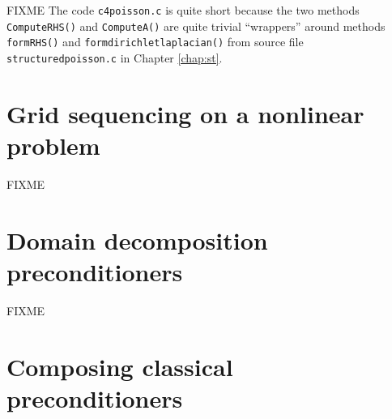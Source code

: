 
FIXME The code \texttt{c4poisson.c} is quite short because the two methods \texttt{ComputeRHS()} and \texttt{ComputeA()} are quite trivial ``wrappers'' around methods \texttt{formRHS()} and \texttt{formdirichletlaplacian()} from source file \texttt{structuredpoisson.c} in Chapter \ref{chap:st}.  %



\section{Grid sequencing on a nonlinear problem}

FIXME

\section{Domain decomposition preconditioners}

FIXME

%
%

\section{Composing classical preconditioners}

